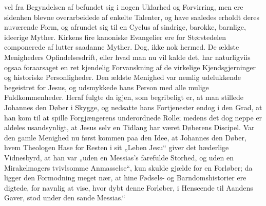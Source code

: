\documentclass[12pt,a4paper]{book}
\begin{document}
vel fra Begyndelsen af befundet sig i nogen Uklarhed og Forvirring, men ere
sidenhen blevne overarbeidede af enkelte Talenter, og have saaledes erholdt deres
nuværende Form, og afrundet sig til en Cyclus af sindrige, barokke, barnlige,
ideerige Myther. Kirkens fire kanoniske Evangelier ere for Størstedelen
componerede af lutter saadanne Myther. Dog, ikke nok hermed. De ældste
Menigheders Opfindelsesdrift, eller hvad man nu vil kalde det, har naturligviis
ogsaa foraarsaget en ret kjendelig Forvanskning af de virkelige
Kjendsgjerninger og historiske Personligheder. Den ældste Menighed var nemlig
udelukkende begeistret for Jesus, og udsmykkede hans Person med alle mulige
Fuldkommenheder. Heraf fulgte da igjen, som begribeligt er, at man stillede
Johannes den Døber i Skygge, og nedsatte hans Fortjenester endog i den Grad, at
han kom til at spille Forgjængerens underordnede Rolle; medens det dog neppe er
aldeles usandsynligt, at Jesus selv en Tidlang har været Døberens Discipel. Var
den gamle Menighed nu først kommen paa den Idee, at Johannes den Døber, hvem
Theologen Hase for Resten i sit „Leben Jesu“ giver det hæderlige Vidnesbyrd, at
han var „uden en Messias's farefulde Storhed, og uden en Mirakelmagers
tvivlsomme Anmasselse“, kun skulde gjælde for en Forløber; da ligger den
Formodning meget nær, at hine Fødsels- og Barndomshistorier ere digtede, for
navnlig at vise, hvor dybt denne Forløber, i Henseende til Aandens Gaver, stod
under den sande Messias.“
\end{document}
